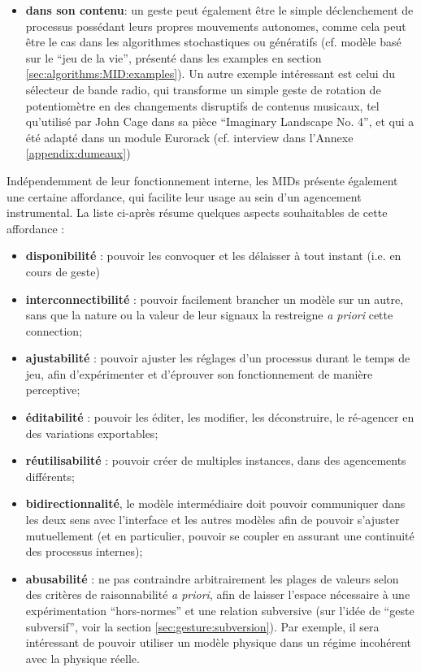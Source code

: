 \begin{itemize}[noitemsep]
	\item \textbf{dans son contenu}: un geste peut également être le simple déclenchement de processus possédant leurs propres mouvements autonomes, comme cela peut être le cas dans les algorithmes stochastiques ou génératifs (cf. modèle basé sur le ``jeu de la vie'', présenté dans les examples en section \ref{sec:algorithms:MID:examples}). Un autre exemple intéressant est celui du sélecteur de bande radio, qui transforme un simple geste de rotation de potentiomètre en des changements disruptifs de contenus musicaux, tel qu'utilisé par John Cage dans sa pièce ``Imaginary Landscape No. 4'', et qui a été adapté dans un module Eurorack (cf. interview dans l'Annexe \ref{appendix:dumeaux})

\end{itemize}


\noindent Indépendemment de leur fonctionnement interne, les MIDs présente également une certaine affordance, qui facilite leur usage au sein d'un agencement instrumental. La liste ci-après résume quelques aspects souhaitables de cette affordance :
\vspace{-1em}
\begin{itemize}[noitemsep]
	\item \textbf{disponibilité} : pouvoir les convoquer et les délaisser à tout instant (i.e. en cours de geste)
	\item \textbf{interconnectibilité} : pouvoir facilement brancher un modèle sur un autre, sans que la nature ou la valeur de leur signaux la restreigne \textit{a priori} cette connection;
	\item \textbf{ajustabilité} : pouvoir ajuster les réglages d'un processus durant le temps de jeu, afin d'expérimenter et d'éprouver son fonctionnement de manière perceptive;
	\item \textbf{éditabilité} : pouvoir les éditer, les modifier, les déconstruire, le ré-agencer en des variations exportables;
	\item \textbf{réutilisabilité} : pouvoir créer de multiples instances, dans des agencements différents;
	\item \textbf{bidirectionnalité}, le modèle intermédiaire doit pouvoir communiquer dans les deux sens avec l'interface et les autres modèles afin de pouvoir s'ajuster mutuellement (et en particulier, pouvoir se coupler en assurant une continuité des processus internes);
	\item \textbf{abusabilité} : ne pas contraindre arbitrairement les plages de valeurs selon des critères de raisonnabilité \textit{a priori}, afin de laisser l'espace nécessaire à une expérimentation ``hors-normes'' et une relation subversive (sur l'idée de ``geste subversif'', voir la section \ref{sec:gesture:subversion}). Par exemple, il sera intéressant de pouvoir utiliser un modèle physique dans un régime incohérent avec la physique réelle.
\end{itemize}


